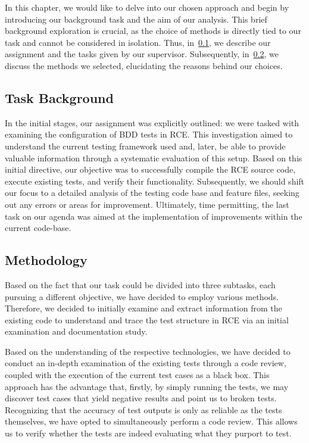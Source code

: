 In this chapter, we would like to delve into our chosen approach and begin by introducing our background task and the aim of our analysis. This brief background exploration is crucial, as the choice of methods is directly tied to our task and cannot be considered in isolation. Thus, in~\cref{subsec:Task}, we describe our assignment and the tasks given by our supervisor. Subsequently, in~\cref{subsec:Methodologies}, we discuss the methods we selected, elucidating the reasons behind our choices.

\subsection{Task Background}
\label{subsec:Task}
In the initial stages, our assignment was explicitly outlined: we were tasked with examining the configuration of \ac{BDD} tests in \ac{RCE}. This investigation aimed to understand the current testing framework used and, later, be able to provide valuable information through a systematic evaluation of this setup. Based on this initial directive, our objective was to successfully compile the \ac{RCE} source code, execute existing tests, and verify their functionality. Subsequently, we should shift our focus to a detailed analysis of the testing code base and feature files, seeking out any errors or areas for improvement. Ultimately, time permitting, the last task on our agenda was aimed at the implementation of improvements within the current code-base.

\subsection{Methodology}
\label{subsec:Methodologies}
Based on the fact that our task could be divided into three subtasks, each pursuing a different objective, we have decided to employ various methods. Therefore, we decided to initially examine and extract information from the existing code to understand and trace the test structure in \ac{RCE} via an initial examination and documentation study.

Based on the understanding of the respective technologies, we have decided to conduct an in-depth examination of the existing tests through a code review, coupled with the execution of the current test cases as a black box. This approach has the advantage that, firstly, by simply running the tests, we may discover test cases that yield negative results and point us to broken tests. Recognizing that the accuracy of test outputs is only as reliable as the tests themselves, we have opted to simultaneously perform a code review. This allows us to verify whether the tests are indeed evaluating what they purport to test. 

